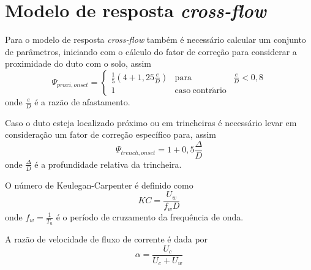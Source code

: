\section{Modelo de resposta \textit{cross-flow}}

Para o modelo de resposta \textit{cross-flow} também  é necessário calcular um conjunto de parâmetros, iniciando com o cálculo do fator de correção para considerar a proximidade do duto com o solo, assim
\begin{equation}
\label{eq:jdsn-Psi}
\Psi_{\mathit{proxi}, \mathit{onset}} =
\left\{
\begin{matrix}
\frac{1}{5}\left(4 + 1,25\frac{e}{D} \right) & \mathrm{para} & \frac{e}{D} < {0,8}  \\
1                                            & \mathrm{caso~contr\acute{a}rio}
\end{matrix}
\right.
\end{equation}
onde $\frac{e}{D}$ é a razão de afastamento.

Caso o duto esteja localizado próximo ou em trincheiras é necessário levar em consideração um fator de correção específico para, assim
\begin{equation}
\label{eq:jdsn-Psitren}
\Psi_{\mathit{trench}, \mathit{onset}} = 1 + 0,5\frac{\Delta}{D}
\end{equation}
onde $\frac{\Delta}{D}$ é a profundidade relativa da trincheira.

O número de Keulegan-Carpenter é definido como
\begin{equation}
\label{eq:jdsn-KC}
\mathit{KC} = \frac{U_w}{f_w D}
\end{equation}
onde $f_w = \frac{1}{T_u}$ é o período de cruzamento da frequência de onda.

A razão de velocidade de fluxo de corrente é dada por
\begin{equation}
\label{eq:jdsn-alfa}
\alpha = \frac{U_c}{U_c + U_w}
\end{equation}

